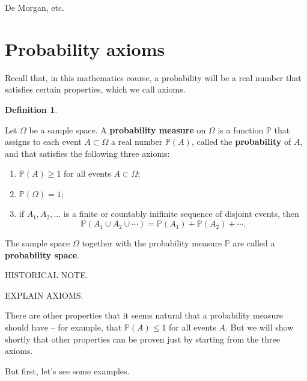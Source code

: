 \documentclass[
  a4paper,
]{book}
\providecommand{\tightlist}{%
  \setlength{\itemsep}{0pt}\setlength{\parskip}{0pt}}
\theoremstyle{definition}
\newtheorem{definition}{Definition}[chapter]
\theoremstyle{definition}
\theoremstyle{definition}
\theoremstyle{remark}
\begin{document}
De Morgan, etc.

\hypertarget{axioms}{%
\section{Probability axioms}\label{axioms}}

Recall that, in this mathematics course, a probability will be a real number that satisfies certain properties, which we call axioms.

\begin{definition}
\protect\hypertarget{def:def-axioms}{}\label{def:def-axioms}

Let \(\Omega\) be a sample space. A \textbf{probability measure} on \(\Omega\) is a function \(\mathbb P\) that assigns to each event \(A \subset \Omega\) a real number \(\mathbb P(A)\), called the \textbf{probability} of \(A\), and that satisfies the following three axioms:

\begin{enumerate}
\def\labelenumi{\arabic{enumi}.}
\tightlist
\item
  \(\mathbb P(A) \geq 1\) for all events \(A \subset \Omega\);
\item
  \(\mathbb P(\Omega) = 1\);
\item
  if \(A_1, A_2, \dots\) is a finite or countably inifinite sequence of disjoint events, then
  \[ \mathbb P(A_1 \cup A_2 \cup \cdots) = \mathbb P(A_1) + \mathbb P(A_2) + \cdots . \]
\end{enumerate}

The sample space \(\Omega\) together with the probability measure \(\mathbb P\) are called a \textbf{probability space}.

\end{definition}

HISTORICAL NOTE.

EXPLAIN AXIOMS.

There are other properties that it seems natural that a probability measure should have -- for example, that \(\mathbb P(A) \leq 1\) for all events \(A\). But we will show shortly that other properties can be proven just by starting from the three axioms.

But first, let's see some examples.
\end{document}
